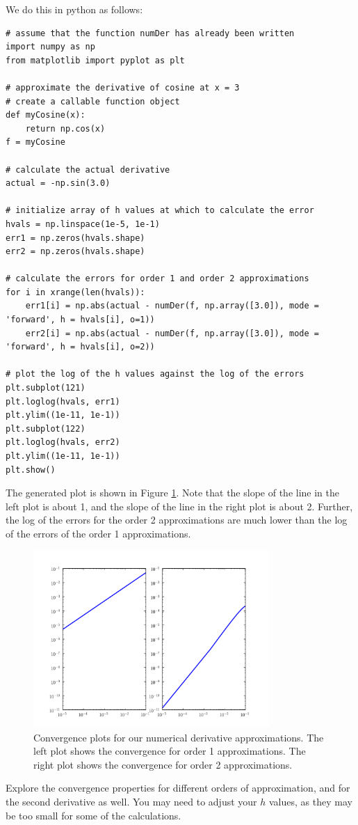 We do this in python as follows:
\begin{lstlisting}
# assume that the function numDer has already been written
import numpy as np
from matplotlib import pyplot as plt

# approximate the derivative of cosine at x = 3
# create a callable function object
def myCosine(x):
    return np.cos(x)
f = myCosine

# calculate the actual derivative
actual = -np.sin(3.0)

# initialize array of h values at which to calculate the error
hvals = np.linspace(1e-5, 1e-1)
err1 = np.zeros(hvals.shape)
err2 = np.zeros(hvals.shape)

# calculate the errors for order 1 and order 2 approximations
for i in xrange(len(hvals)):
    err1[i] = np.abs(actual - numDer(f, np.array([3.0]), mode = 'forward', h = hvals[i], o=1))
    err2[i] = np.abs(actual - numDer(f, np.array([3.0]), mode = 'forward', h = hvals[i], o=2))

# plot the log of the h values against the log of the errors
plt.subplot(121)
plt.loglog(hvals, err1)
plt.ylim((1e-11, 1e-1))
plt.subplot(122)
plt.loglog(hvals, err2)
plt.ylim((1e-11, 1e-1))
plt.show()
\end{lstlisting}

The generated plot is shown in Figure \ref{fig:convergence}. Note that the slope
of the line in the left plot is about 1, and the slope of the line in the right
plot is about 2. Further, the log of the errors for the order 2 approximations
are much lower than the log of the errors of the order 1 approximations.

\begin{figure}[t]
    \includegraphics[width=0.8\textwidth]{convergence.pdf}
    \caption{Convergence plots for our numerical derivative approximations.
    The left plot shows the convergence for order 1 approximations. 
    The right plot shows the convergence for order 2 approximations.}
    \label{fig:convergence}
\end{figure}

\begin{problem}
Explore the convergence properties for different orders of approximation,
and for the second derivative as well. You may need to adjust your $h$
values, as they may be too small for some of the calculations.
\end{problem}
